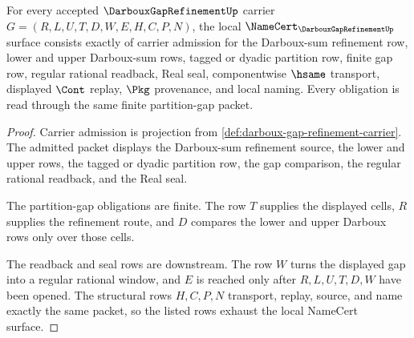 \begin{theorem}
\label{thm:darboux-gap-refinement-namecert-obligations}
For every accepted $\DarbouxGapRefinementUp$ carrier $G=(R,L,U,T,D,W,E,H,C,P,N)$, the local $\NameCert_{\DarbouxGapRefinementUp}$ surface consists exactly of carrier admission for the Darboux-sum refinement row, lower and upper Darboux-sum rows, tagged or dyadic partition row, finite gap row, regular rational readback, Real seal, componentwise $\hsame$ transport, displayed $\Cont$ replay, $\Pkg$ provenance, and local naming. Every obligation is read through the same finite partition-gap packet.
\end{theorem}
\begin{proof}
Carrier admission is projection from \autoref{def:darboux-gap-refinement-carrier}. The admitted packet displays the Darboux-sum refinement source, the lower and upper rows, the tagged or dyadic partition row, the gap comparison, the regular rational readback, and the Real seal.

The partition-gap obligations are finite. The row $T$ supplies the displayed cells, $R$ supplies the refinement route, and $D$ compares the lower and upper Darboux rows only over those cells.

The readback and seal rows are downstream. The row $W$ turns the displayed gap into a regular rational window, and $E$ is reached only after $R,L,U,T,D,W$ have been opened. The structural rows $H,C,P,N$ transport, replay, source, and name exactly the same packet, so the listed rows exhaust the local NameCert surface.
\end{proof}

